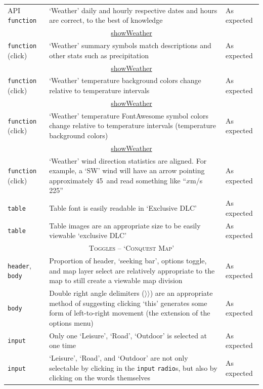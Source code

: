 \documentclass[11pt, english]{article}
\begin{document}
\begin{center}
\begin{longtable}{p{3cm}p{8cm}p{2cm}}
		API \texttt{function} & `Weather' daily and hourly respective dates and hours are correct, to the best of knowledge & As expected\\
		\multicolumn{3}{c}{\underline{showWeather}}\\
		\texttt{function} (click) & `Weather' summary symbols match descriptions and other stats such as precipitation & As expected\\
		\multicolumn{3}{c}{\underline{showWeather}}\\
		\texttt{function} (click) & `Weather' temperature background colors change relative to temperature intervals & As expected\\
		\multicolumn{3}{c}{\underline{showWeather}}\\
		\texttt{function} (click) & `Weather' temperature FontAwesome symbol colors change relative to temperature intervals (temperature background colors) & As expected\\
		\multicolumn{3}{c}{\underline{showWeather}}\\
		\texttt{function} (click) & `Weather' wind direction statistics are aligned. For example, a `SW' wind will have an arrow pointing approximately 45\textdegree\ and read something like ``$x$m/s \@ 225\textdegree'' & As expected\\
		\texttt{table} & Table font is easily readable in `Exclusive DLC' & As expected\\
		\texttt{table} & Table images are an appropriate size to be easily viewable `exclusive DLC' & As expected\\
		\hline
		\multicolumn{3}{c}{\textsc{Toggles -- `Conquest Map'}}\\
		\hline
		\texttt{header}, \texttt{body} & Proportion of header, `seeking bar', options toggle, and map layer select are relatively appropriate to the map to still create a viewable map division & As expected\\
		\texttt{body} & Double right angle delimiters ($\rangle\rangle$) are an appropriate method of suggesting clicking `this' generates some form of left-to-right movement (the extension of the options menu) & As expected\\
		\texttt{input} & Only one `Leisure', `Road', `Outdoor' is selected at one time & As expected\\
		\texttt{input} & `Leisure', `Road', and `Outdoor' are not only selectable by clicking in the \texttt{input} \texttt{radio}s, but also by clicking on the words themselves & As expected\\
		\hline

\end{longtable}
\end{center}
\end{document}
